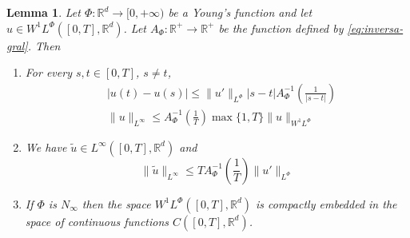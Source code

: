 \documentclass[twoside]{article}
\newtheorem{lem}[thm]{Lemma}
\theoremstyle{remark}
\newcommand{\orlnor}{\|_{L^{\Phi}}}
\newcommand{\linf}{\|_{L^{\infty}}}
\newcommand{\lphi}{L^{\Phi}}
\newcommand{\wphi}{W^{1}\lphi}
\newcommand{\sobnor}{\|_{W^{1}\lphi}}
\newcommand{\rr}{\mathbb{R}}
\renewcommand{\leq}{\leqslant}
\begin{document}
\begin{lem}\label{lem:inclusion orlicz} Let $\Phi:\rr^d\to [0,+\infty)$ be a Young's 
function and let $u\in\wphi([0,T],\rr^d)$. Let 
$A_{\Phi}: \rr^+ \to \rr^+$ be the function defined by \eqref{eq:inversa-gral}. Then
\begin{enumerate}
\item\label{inclusion orlicz_item1} For every $s,t\in [0,T]$, $s\neq t$,
\begin{align}
 &|u(t)-u(s)| \leq
 \|u'\orlnor |s-t|A_{\Phi}^{-1}\left(\frac{1}{|s-t|}\right)\tag{Morrey's inequality}\label{in-sob-cont}
\\
& \| u\linf \leq A_\Phi^{-1}\left(\frac{1}{T}\right)\max\{1,T\}\|u\sobnor\tag{Sobolev's inequality}\label{eq:sobolev}
\end{align}
\item We have $\widetilde{u}\in L^{\infty}([0,T],\rr^d)$ and
\[
\|\widetilde u \linf \leq T A_{\Phi}^{-1}\left(\frac{1}{T}\right)\|u'\orlnor
\tag{Sobolev-Wirtinger's inequality}\label{wirtinger}
\]
\item\label{it:embeding} If $\Phi$ is $N_{\infty}$ then the space $\wphi([0,T],\rr^d)$ is compactly embedded in the space of continuous functions $C([0,T],\rr^d)$.
\end{enumerate}
\end{lem}
\end{document}
